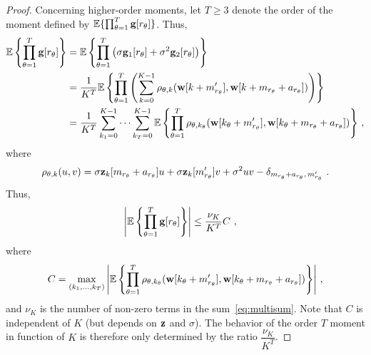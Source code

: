 \documentclass[journal,onecolumn]{IEEEtran}
\begin{document}
\begin{proof}
Concerning higher-order moments, let $T\geq 3$ denote the order of the moment defined by ${\mathbb E}\{\prod_{\theta=1}^T{\mathbf g}[r_\theta]\}$. Thus,
\begin{align}
\nonumber
\EE\left\{\prod_{\theta=1}^T\bg[r_\theta]\right\}& = \EE\left\{\prod_{\theta=1}^T \left(\sigma\bg_1[r_\theta] + \sigma^2\bg_2[r_\theta] \right)\right\}\\
\nonumber
&=\dfrac1{K^T}\EE\left\{\prod_{\theta=1}^T \left(\sum_{k=0}^{K-1}\rho_{\theta,k}(\bw[k+m'_{r_\theta}],\bw[k+m_{r_\theta}+a_{r_\theta}]) \right)\right\}\\ 
&=\dfrac1{K^T}\sum_{k_1=0}^{K-1}\cdots\sum_{k_T=0}^{K-1}\EE\left\{\prod_{\theta=1}^T \rho_{\theta,k_\theta}(\bw[k_\theta+m'_{r_\theta}],\bw[k_\theta+m_{r_\theta}+a_{r_\theta}]) \right\} \,,
\label{eq:multisum}
\end{align}
where
\[
\rho_{\theta,k}(u,v)=\sigma \bz_k[m_{r_\theta}+a_{r_\theta}]u + \sigma \bz_k[m'_{r_\theta}]v + \sigma^2uv - \delta_{m_{r_\theta}+a_{r_\theta},\,m'_{r_\theta}}\ .
\]
Thus,
\begin{align*}
\left|{\mathbb E}\left\{\prod_{\theta=1}^T{\mathbf g}[r_\theta]\right\}\right| &\leq \dfrac{\nu_K}{K^T} C\ ,
\end{align*}
where
\[
C = \max_{(k_1,\ldots,k_T)} \left|{\mathbb E}\left\{\prod_{\theta=1}^T \rho_{\theta,k_\theta}({\mathbf w}[k_\theta+m'_{r_\theta}],{\mathbf w}[k_\theta+m_{r_\theta}+a_{r_\theta}]) \right\} \right| \,,
\]
and $\nu_K$ is the number of non-zero terms in the sum~\eqref{eq:multisum}. Note that $C$ is independent of $K$ (but depends on ${\mathbf z}$ and $\sigma$). The behavior of the order $T$ moment in function of $K$ is therefore only determined by the ratio $\dfrac{\nu_K}{K^T}$.


\end{proof}
\end{document}

